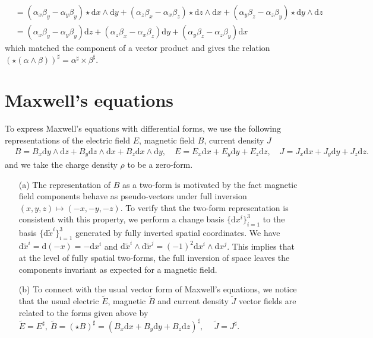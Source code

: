 \documentclass[10pt, a4paper]{article}
\begin{document}
{\begin{enumerate}
\begin{enumerate}
\begin{align*}
      &= (\alpha_x \beta_y - \alpha_y \beta_y) \star\text{d}x\wedge\text{d}y + (\alpha_z \beta_x - \alpha_x \beta_z) \star\text{d}z\wedge\text{d}x + (\alpha_y \beta_z - \alpha_z \beta_y)  \star\text{d}y\wedge\text{d}z \\
      &= (\alpha_x \beta_y - \alpha_y \beta_y) \text{d}z + (\alpha_z \beta_x - \alpha_x \beta_z) \text{d}y + (\alpha_y \beta_z - \alpha_z \beta_y) \text{d}x
    \end{align*}
    which matched the component of a vector product and gives the relation $(\star (\alpha \wedge \beta))^\sharp = \alpha^\sharp \times \beta^\sharp$.
  \end{enumerate}
\end{enumerate}  

\section{Maxwell's equations}
To express Maxwell's equations with differential forms, we use the following representations of the electric field $E$, magnetic field $B$, current density $J$
\begin{align*}
  & B=B_x \mathrm{d} y \wedge \mathrm{d} z+B_y \mathrm{d} z \wedge \mathrm{d} x+B_z \mathrm{d} x \wedge \mathrm{d} y, \quad E=E_x \mathrm{d} x+E_y \mathrm{d} y+E_z \mathrm{d} z, \quad J=J_x \mathrm{d} x+J_y \mathrm{d} y+J_z \mathrm{d} z. 
\end{align*}
and we take the charge density $\rho$ to be a zero-form. 
\begin{enumerate}
  \item[(a)] The representation of $B$ as a two-form is motivated by the fact magnetic field components behave as pseudo-vectors under full inversion $(x, y, z) \mapsto (-x, -y, -z)$. To verify that the two-form representation is consistent with this property, we perform a change basis $\{\text{d}x^i\}_{i=1}^3$ to the basis $\{\text{d}\tilde{x}^i\}_{i=1}^3$ generated by fully inverted spatial coordinates. We have $\text{d}\tilde{x}^i = \text{d}(-x) = -\text{d}x^i$ and $\text{d}\tilde{x}^i \wedge \text{d}\tilde{x}^j = (-1)^2 \text{d}x^i \wedge \text{d}x^j$. This implies that at the level of fully spatial two-forms, the full inversion of space leaves the components invariant as expected for a magnetic field.
  \item[(b)] To connect with the usual vector form of Maxwell's equations, we notice that the usual electric $\tilde{E}$, magnetic $\tilde{B}$ and current density $\tilde{J}$ vector fields are related to the forms given above by $\tilde{E} = E^\sharp, \ \tilde{B} = (\star B)^\sharp = (B_x \text{d}x + B_y \text{d}y + B_z \text{d}z)^\sharp, \ \quad \tilde{J} = J^\sharp$.

\end{enumerate}}
\end{document}
